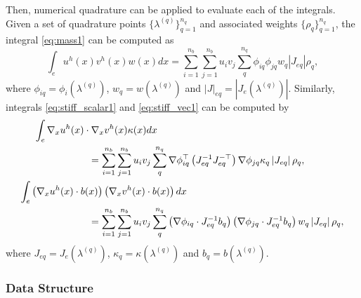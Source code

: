 \documentclass[a4paper,11pt]{scrartcl}
\newcommand{\eq}[1]{\begin{equation} #1 \end{equation}}
\newcommand{\eqs}[1]{\begin{align} #1 \end{align}}
\begin{document}
Then, numerical quadrature can be applied to evaluate each of the integrals. Given a set of quadrature points $\{\lambda^{(q)}\}_{q=1}^{n_q}$ and associated weights $\{\rho_q\}_{q=1}^{n_q}$, the integral \eqref{eq:mass1} can be computed as
\eq{
\int_{e} u^h(x) v^h(x) w(x) dx = \sum_{i=1}^{n_b} \sum_{j=1}^{n_b} u_i v_j \sum_{q}^{n_q} \phi_{iq} \phi_{jq} w_q \left|J_{eq}\right|\rho_q, \label{eq:mass2}
}
where $\phi_{iq} = \phi_i( \lambda^{(q)} )$, $w_q = w(\lambda^{(q)}) $ and $\left|J\right|_{eq} = \left|J_e(\lambda^{(q)})\right|$.
Similarly, integrals \eqref{eq:stiff_scalar1} and \eqref{eq:stiff_vec1} can be computed by
\eqs{
\int_{e} \nabla_x u^h(x) \cdot \nabla_x v^h(x) \kappa(x) dx  \hspace{-7em} & \nonumber \\
& =
\sum_{i=1}^{n_b} \sum_{j=1}^{n_b} u_i v_j \sum_{q}^{n_q} \nabla \phi_{iq} ^\top \left( J_{eq}^{-1} J_{eq}^{-\top} \right) \nabla \phi_{jq} \kappa_q \left|J_{eq}\right|\rho_q, \label{eq:stiff_scalar2} \\
%
%
\int_{e} \left( \nabla_x u^h(x) \cdot b(x) \right) \left( \nabla_x v^h(x) \cdot b(x) \right) dx \hspace{-10em} &  \nonumber \\
& = \sum_{i=1}^{n_b} \sum_{j=1}^{n_b} u_i v_j \sum_{q}^{n_q}\left( \nabla \phi_{iq} \cdot J_{eq}^{-1} b_q \right) \left( \nabla \phi_{jq} \cdot J_{eq}^{-1} b_q \right) w_q \left|J_{eq}\right|\rho_q,\label{eq:stiff_vector2}
}
where $J_{eq} = J_e(\lambda^{(q)})$, $\kappa_q = \kappa(\lambda^{(q)}) $ and $b_q = b(\lambda^{(q)}) $.
%

\subsubsection{Data Structure}
\end{document}
